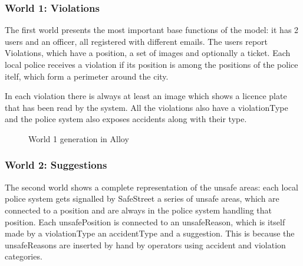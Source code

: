 \subsubsection{World 1: Violations}
The first world presents the most important base functions of the model: it has 2 users and an
officer, all registered with different emails. The users report Violations, which have a position, a set of images
and optionally a ticket. Each local police receives a violation if its position is among the positions of the police itelf,
which form a perimeter around the city.

In each violation there is always at least an image which shows a licence plate that has been read
by the system. All the violations also have a violationType and the police system also exposes accidents along with their type.

\begin{figure}
    \noindent{}
    \caption{World 1 generation in Alloy}
\end{figure}

\subsubsection{World 2: Suggestions}
The second world shows a complete representation of the unsafe areas: each local police system gets signalled by SafeStreet
a series of unsafe areas, which are connected to a position and are always in the police system handling that position.
Each unsafePosition is connected to an unsafeReason, which is itself made by a violationType an accidentType and a suggestion. This is
because the unsafeReasons are inserted by hand by operators using accident and violation categories.

